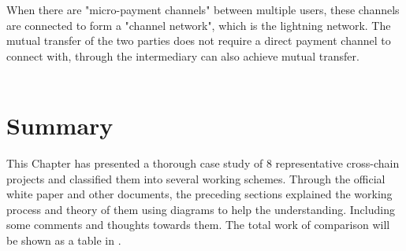 \noindent When there are "micro-payment channels" between multiple users, these channels are connected to form a "channel network", which is the lightning network. The mutual transfer of the two parties does not require a direct payment channel to connect with, through the intermediary can also achieve mutual transfer. \\ \\




















\section{Summary}
\noindent This Chapter has presented a thorough case study of 8 representative cross-chain projects and classified them into several working schemes. Through the official white paper and other documents, the preceding sections explained the working process and theory of them using diagrams to help the understanding. Including some comments and thoughts towards them. The total work of comparison will be shown as a table in .


%